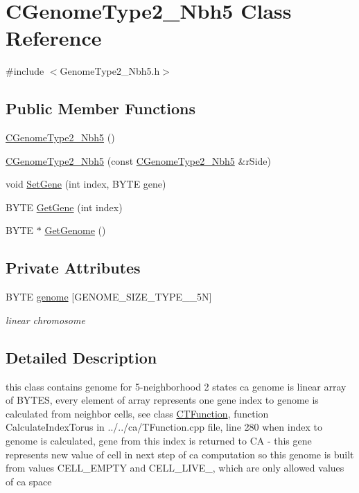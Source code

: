 \hypertarget{classCGenomeType2__Nbh5}{
\section{CGenomeType2\_\-Nbh5 Class Reference}
\label{classCGenomeType2__Nbh5}
}


{\ttfamily \#include $<$GenomeType2\_\-Nbh5.h$>$}\subsection*{Public Member Functions}
\begin{DoxyCompactItemize}
\item 
\hyperlink{classCGenomeType2__Nbh5_a0ccd012da09e8edaea35f9f3b94504c8}{CGenomeType2\_\-Nbh5} ()
\item 
\hyperlink{classCGenomeType2__Nbh5_a4d69266c619a26feddee962c8b4b637b}{CGenomeType2\_\-Nbh5} (const \hyperlink{classCGenomeType2__Nbh5}{CGenomeType2\_\-Nbh5} \&rSide)
\item 
void \hyperlink{classCGenomeType2__Nbh5_aa320d2a086b02a7a76f4701d344b5ddf}{SetGene} (int index, BYTE gene)
\item 
BYTE \hyperlink{classCGenomeType2__Nbh5_ad50ac399c0577cee5c0f128ad058a2b7}{GetGene} (int index)
\item 
BYTE $\ast$ \hyperlink{classCGenomeType2__Nbh5_af9293f1cd27a74195c9ceeaa8e212d7e}{GetGenome} ()
\end{DoxyCompactItemize}
\subsection*{Private Attributes}
\begin{DoxyCompactItemize}
\item 
\hypertarget{classCGenomeType2__Nbh5_aa4ac9085f95b891840d025804c9461dc}{
BYTE \hyperlink{classCGenomeType2__Nbh5_aa4ac9085f95b891840d025804c9461dc}{genome} \mbox{[}GENOME\_\-SIZE\_\-TYPE\_\_\-5N\mbox{]}}
\label{classCGenomeType2__Nbh5_aa4ac9085f95b891840d025804c9461dc}

\begin{DoxyCompactList}\small\item\em linear chromosome \item\end{DoxyCompactList}\end{DoxyCompactItemize}


\subsection{Detailed Description}
this class contains genome for 5-\/neighborhood 2 states ca genome is linear array of BYTES, every element of array represents one gene index to genome is calculated from neighbor cells, see class \hyperlink{classCTFunction}{CTFunction}, function CalculateIndexTorus in ../../ca/TFunction.cpp file, line 280 when index to genome is calculated, gene from this index is returned to CA -\/ this gene represents new value of cell in next step of ca computation so this genome is built from values CELL\_\-EMPTY and CELL\_\-LIVE\_, which are only allowed values of ca space 

